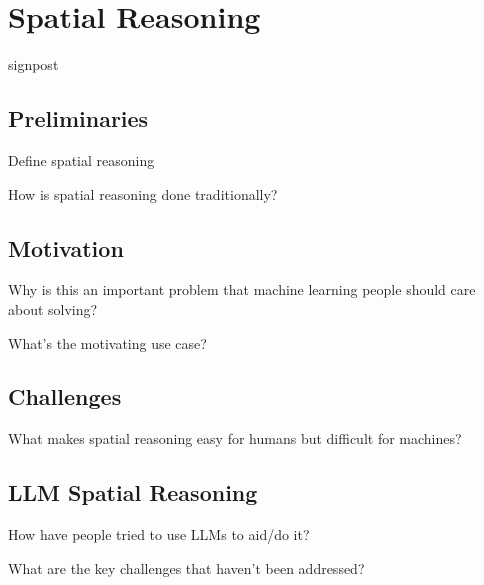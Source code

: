 \section{Spatial Reasoning}
\label{section:background}

signpost

\subsection{Preliminaries}
Define spatial reasoning

How is spatial reasoning done traditionally?

\subsection{Motivation}
Why is this an important problem that machine learning people should care about solving?

What's the motivating use case?


\subsection{Challenges}
What makes spatial reasoning easy for humans but difficult for machines?


\subsection{LLM Spatial Reasoning}
How have people tried to use LLMs to aid/do it?

What are the key challenges that haven't been addressed?